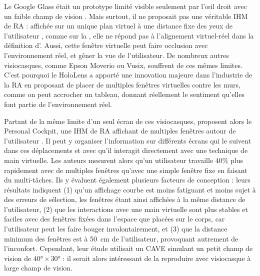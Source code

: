 Le Google Glass était un prototype limité visible seulement par l'\oe il droit avec un faible champ de vision . Mais surtout, il ne proposait pas une véritable IHM de RA : affichée sur un unique plan virtuel à une distance fixe des yeux de l'utilisateur , comme sur la , elle ne répond pas à l'alignement virtuel-réel dans la définition d'\cite{Azuma1997}. Aussi, cette fenêtre virtuelle peut faire occlusion avec l'environnement réel, et gêner la vue de l'utilisateur. De nombreux autres visiocasques, comme Epson Moverio ou Vusix, souffrent de ces mêmes limites. C'est pourquoi le HoloLens a apporté une innovation majeure dans l'industrie de la RA en proposant de placer de multiples fenêtres virtuelles contre les murs, comme on peut accrocher un tableau, donnant réellement le sentiment qu'elles font partie de l'environnement réel.


Partant de la même limite d'un seul écran de ces visiocasques, \cite{Ens2014} proposent alors le Personal Cockpit, une IHM de RA affichant de multiples fenêtres autour de l'utilisateur . Il peut y organiser l'information sur différents écrans qui le suivent dans ces déplacements et avec qu'il interagit directement avec une technique de main virtuelle. Les auteurs mesurent alors qu'un utilisateur travaille 40\% plus rapidement avec de multiples fenêtres qu'avec une simple fenêtre fixe en faisant du multi-tâches. Ils y évaluent également plusieurs facteurs de conception : leurs résultats indiquent (1) qu'un affichage courbe est moins fatiguant et moins sujet à des erreurs de sélection, les fenêtres étant ainsi affichées à la même distance de l'utilisateur, (2) que les interactions avec une main virtuelle sont plus stables et faciles avec des fenêtres fixées dans l'espace que placées sur le corps, car l'utilisateur peut les faire bouger involontairement, et (3) que la distance minimum des fenêtres est à \SI{50}{\cm} de l'utilisateur, provoquant autrement de l'inconfort. Cependant, leur étude utilisait un CAVE simulant un petit champ de vision de $\ang{40} \times \ang{30}$ : il serait alors intéressant de la reproduire avec visiocasque à large champ de vision.

